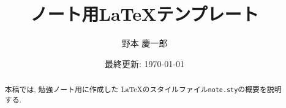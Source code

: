 \documentclass[
	paper=a4,
	fontsize=11pt,
	head_space=2.4cm,
	foot_space=2.4cm,
	gutter=1cm,
	fore-edge=1cm,
	titlepage,
]{jlreq}
\title{ノート用\LaTeX テンプレート}
\author{野本 慶一郎}
\date{最終更新: \today}
\begin{document}
\maketitle
\thispagestyle{empty}

\begin{abstract}
	本稿では, 勉強ノート用に作成した \LaTeX のスタイルファイル\texttt{note.sty}の概要を説明する.
	\lipsum[1][1-5]
\end{abstract}

\tableofcontents
\newpage












\clearpage
\thispagestyle{empty}
\printbibliography[title=参考文献]

\end{document}
